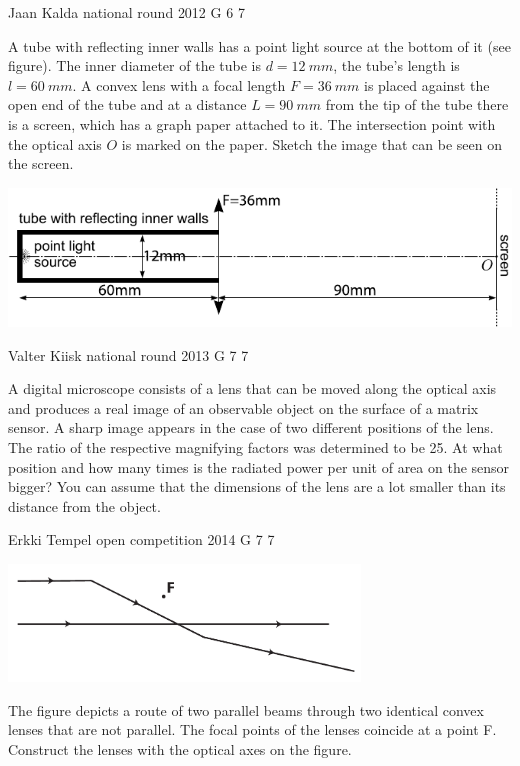 \documentclass[11pt]{article}
\begin{document}
{Jaan Kalda} %
{national round} %
{2012} %
{G 6} %
{7} %
{

\ifEngStatement
A tube with reflecting inner walls has a point light source at the bottom of it (see figure). The inner diameter of the tube is $d=\SI{12}{mm}$, the tube’s length is $l=\SI{60}{mm}$. A convex lens with a focal length $F=\SI{36}{mm}$ is placed against the open end of the tube and at a distance $L=\SI{90}{mm}$ from the tip of the tube there is a screen, which has a graph paper attached to it. The intersection point with the optical axis $O$ is marked on the paper. Sketch the image that can be seen on the screen.
\begin{center}
\includegraphics[width=\textwidth]{2012-v3g-06-toru-valgusallikas-lxxts_ing}
\end{center}
\fi
}

{Valter Kiisk} %
{national round} %
{2013} %
{G 7} %
{7} %
{

\ifEngStatement
A digital microscope consists of a lens that can be moved along the optical axis and produces a real image of an observable object on the surface of a matrix sensor. A sharp image appears in the case of two different positions of the lens. The ratio of the respective magnifying factors was determined to be 25. At what position and how many times is the radiated power per unit of area on the sensor bigger? You can assume that the dimensions of the lens are a lot smaller than its distance from the object.
\fi
}

{Erkki Tempel} %
{open competition} %
{2014} %
{G 7} %
{7} %
{

\ifEngStatement
\begin{center}
  \includegraphics[width=0.7\textwidth]{2014-lahg-07-optilineskeemjoonis}
\end{center}
The figure depicts a route of two parallel beams through two identical convex lenses that are not parallel. The focal points of the lenses coincide at a point F. Construct the lenses with the optical axes on the figure.
\fi
}
\end{document}
